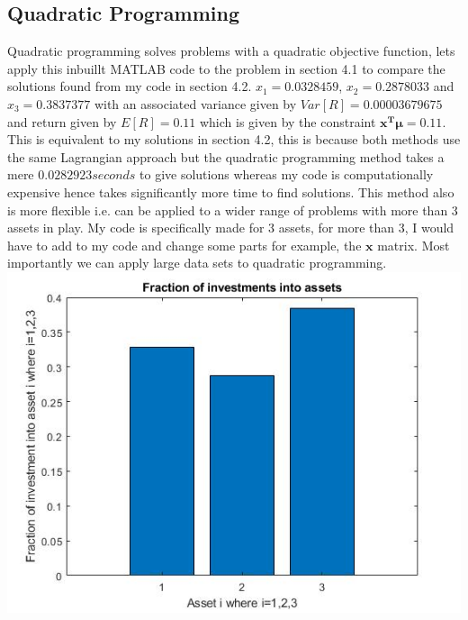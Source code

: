 \documentclass[11pt]{article}
\begin{document}
\subsection{Quadratic Programming}
Quadratic programming solves problems with a quadratic objective function, lets apply this inbuillt MATLAB code\citep{MATLAB2} to the problem in section 4.1 to compare the solutions found from my code in section 4.2. $x_{1}=0.0328459$, $x_{2}=0.2878033$ and $x_{3}=0.3837377$ with an associated variance given by $Var[R]=0.00003679675$ and return given by $E[R]=0.11$ which is given by the constraint $\mathbf{x^T}  \boldsymbol\mu = 0.11$. This is equivalent to my solutions in section 4.2, this is because both methods use the same Lagrangian approach but the quadratic programming method takes a mere $0.0282923seconds$ to give solutions whereas my code is computationally expensive hence takes significantly more time to find solutions. This method also is more flexible i.e. can be applied to a wider range of problems with more than 3 assets in play. My code is specifically made for 3 assets, for more than 3, I would have to add to my code and change some parts for example, the $\mathbf{x}$ matrix. Most importantly we can apply large data sets to quadratic programming.
 \includegraphics[scale=0.6]{PSPfig2} 
\newpage


\newpage 
\end{document}
